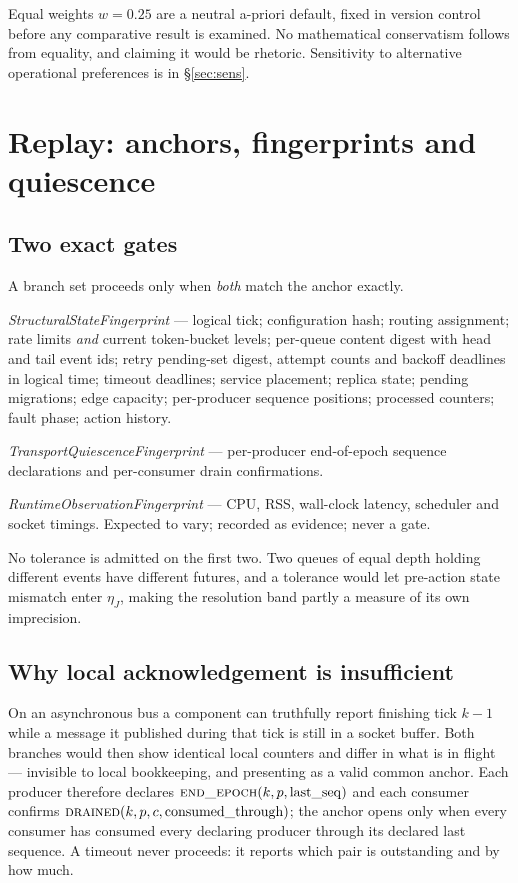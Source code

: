 \documentclass[journal]{IEEEtran}
\begin{document}
Equal weights $w=0.25$ are a neutral a-priori default, fixed in version control
before any comparative result is examined. No mathematical conservatism follows
from equality, and claiming it would be rhetoric. Sensitivity to alternative
operational preferences is in \S\ref{sec:sens}.

\section{Replay: anchors, fingerprints and quiescence}
\subsection{Two exact gates}
A branch set proceeds only when \emph{both} match the anchor exactly.

\emph{StructuralStateFingerprint} --- logical tick; configuration hash; routing
assignment; rate limits \emph{and} current token-bucket levels; per-queue
content digest with head and tail event ids; retry pending-set digest, attempt
counts and backoff deadlines in logical time; timeout deadlines; service
placement; replica state; pending migrations; edge capacity; per-producer
sequence positions; processed counters; fault phase; action history.

\emph{TransportQuiescenceFingerprint} --- per-producer end-of-epoch sequence
declarations and per-consumer drain confirmations.

\emph{RuntimeObservationFingerprint} --- CPU, RSS, wall-clock latency,
scheduler and socket timings. Expected to vary; recorded as evidence; never a
gate.

No tolerance is admitted on the first two. Two queues of equal depth holding
different events have different futures, and a tolerance would let pre-action
state mismatch enter $\eta_J$, making the resolution band partly a measure of
its own imprecision.

\subsection{Why local acknowledgement is insufficient}
On an asynchronous bus a component can truthfully report finishing tick $k-1$
while a message it published during that tick is still in a socket buffer. Both
branches would then show identical local counters and differ in what is in
flight --- invisible to local bookkeeping, and presenting as a valid common
anchor. Each producer therefore declares
$\textsc{end\_epoch}(k,p,\mathrm{last\_seq})$ and each consumer confirms
$\textsc{drained}(k,p,c,\mathrm{consumed\_through})$; the anchor opens only when
every consumer has consumed every declaring producer through its declared last
sequence. A timeout never proceeds: it reports which pair is outstanding and by
how much.
\end{document}

